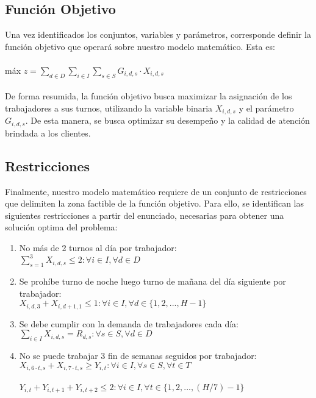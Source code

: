 \subsection{Función Objetivo}
Una vez identificados los conjuntos, variables y parámetros, corresponde definir la función objetivo que operará sobre nuestro modelo matemático. Esta es:\\\\
máx $z=\displaystyle\sum_{d\in D} \sum_{i\in I} \sum_{s\in S}G_{i,d,s} \cdot X_{i,d,s}$\\\\
De forma resumida, la función objetivo busca maximizar la asignación de los trabajadores a sus turnos, utilizando la variable binaria $X_{i,d,s}$ y el parámetro $G_{i,d,s}$. De esta manera, se busca optimizar su desempeño y la calidad de atención brindada a los clientes.
\subsection{Restricciones}
Finalmente, nuestro modelo matemático requiere de un conjunto de restricciones que delimiten la zona factible de la función objetivo. Para ello, se identifican las siguientes restricciones a partir del enunciado, necesarias para obtener una solución optima del problema:
\begin{enumerate}
    \item No más de 2 turnos al día por trabajador:\\
    $\displaystyle\sum_{s=1}^{3}X_{i,d,s}\leq 2:\forall i\in I, \forall d\in D$
    \item Se prohíbe turno de noche luego turno de mañana del día siguiente por trabajador:\\
    $X_{i,d,3}+X_{i,d+1,1}\leq 1:\forall i\in I, \forall d\in \{1,2,..., H-1\}$
    \item Se debe cumplir con la demanda de trabajadores cada día:\\
    $\displaystyle\sum_{i\in I}X_{i,d,s}= R_{d,s}:\forall s\in S, \forall d\in D$
    \item No se puede trabajar 3 fin de semanas seguidos por trabajador:\\
    $X_{i,6\cdot t,s}+X_{i,7\cdot t,s}\ge Y_{i,t}: \forall i \in I, \forall s \in S, \forall t \in T$\\\\
    $Y_{i,t}+Y_{i,t+1}+Y_{i,t+2}\leq 2:\forall i\in I, \forall t\in \{1,2,...,(H/7)-1\}$
\end{enumerate}

